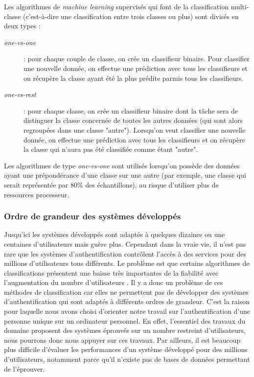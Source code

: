 Les algorithmes de \textit{machine learning} supervisés qui font de la classification multi-classe (c'est-à-dire une classification entre trois classes ou plus) sont divisés en deux types :


\begin{description}
	\item[\textit{one-vs-one}] : pour chaque couple de classe, on crée un classifieur binaire. Pour classifier une nouvelle donnée, on effectue une prédiction avec tous les classifieurs et on récupère la classe ayant été la plus prédite parmis tous les classifieurs.
	\item[\textit{one-vs-rest}] : pour chaque classe, on crée un classifieur binaire dont la tâche sera de distinguer la classe concernée de toutes les autres données (qui sont alors regroupées dans une classe "autre"). Lorsqu'on veut classifier une nouvelle donnée, on effectue une prédiction avec tous les classifieurs et on récupère la classe qui n'aura pas été classifiée comme étant "autre".
\end{description}

Les algorithmes de type \textit{one-vs-one} sont utilisés lorsqu'on possède des données ayant une prépondérance d'une classe sur une autre (par exemple, une classe qui serait représentée par 80\% des échantillons), au risque d'utiliser plus de ressources processeur.

\subsubsection{Ordre de grandeur des systèmes développés}

Jusqu'ici les systèmes développés sont adaptés à quelques dizaines ou une centaines d'utilisateurs mais guère plus. Cependant dans la vraie vie, il n'est pas rare que les systèmes d'authentification contrôlent l'accès à des services pour des millions d'utilisateurs tous différents. Le problème est que certains algorithmes de classifications présentent une baisse très importantes de la fiabilité avec l'augmentation du nombre d'utilisateurs \cite{panasiuk2016}. Il y a donc un problème de ces méthodes de classification car elles ne permettent pas de développer des systèmes d'authentification qui sont adaptés à différents ordres de grandeur. C'est la raison pour laquelle nous avons choisi d'orienter notre travail sur l'authentification d'une personne unique sur un ordinateur personnel. En effet, l'essentiel des travaux du domaine proposent des systèmes éprouvés sur un nombre restreint d'utilisateurs, nous pourrons donc nous appuyer sur ces travaux. Par ailleurs, il est beaucoup plus difficile d'évaluer les performances d'un système développé pour des millions d'utilisateurs, notamment parce qu'il n'existe pas de bases de données permettant de l'éprouver.


